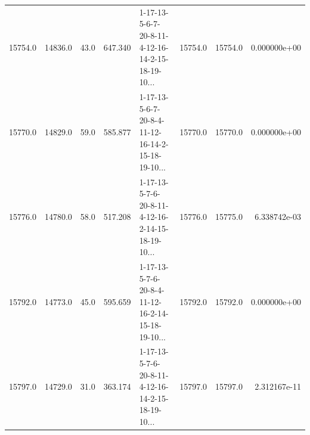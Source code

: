 \begin{tabular}{rrrrlrrr}
 15754.0 &  14836.0 &           43.0 &            647.340 &  1-17-13-5-6-7-20-8-11-4-12-16-14-2-15-18-19-10... &       15754.0 &         15754.0 &  0.000000e+00 \\
 15770.0 &  14829.0 &           59.0 &            585.877 &  1-17-13-5-6-7-20-8-4-11-12-16-14-2-15-18-19-10... &       15770.0 &         15770.0 &  0.000000e+00 \\
 15776.0 &  14780.0 &           58.0 &            517.208 &  1-17-13-5-7-6-20-8-11-4-12-16-2-14-15-18-19-10... &       15776.0 &         15775.0 &  6.338742e-03 \\
 15792.0 &  14773.0 &           45.0 &            595.659 &  1-17-13-5-7-6-20-8-4-11-12-16-2-14-15-18-19-10... &       15792.0 &         15792.0 &  0.000000e+00 \\
 15797.0 &  14729.0 &           31.0 &            363.174 &  1-17-13-5-7-6-20-8-11-4-12-16-14-2-15-18-19-10... &       15797.0 &         15797.0 &  2.312167e-11 \\
\bottomrule
\end{tabular}
